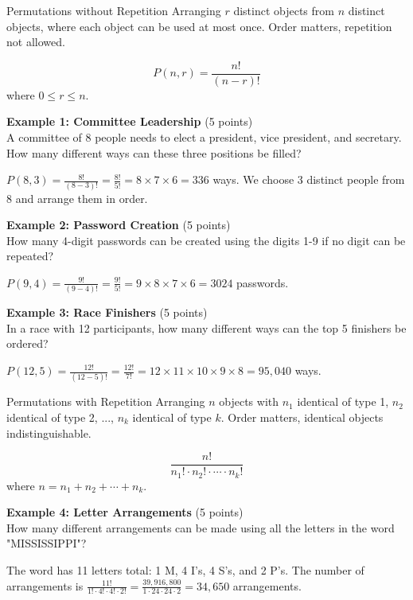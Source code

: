 \newpage



\begin{define}{Permutations without Repetition}
Arranging $r$ distinct objects from $n$ distinct objects, where each object 
can be used at most once. Order matters, repetition not allowed.

$$P(n,r) = \frac{n!}{(n-r)!}$$
where $0 \leq r \leq n$.
\end{define}

\textbf{Example 1: Committee Leadership} (5 points)\\
A committee of 8 people needs to elect a president, vice president, and secretary. How many different ways can these three positions be filled?
\begin{subanswer}
    $P(8,3) = \frac{8!}{(8-3)!} = \frac{8!}{5!} = 8 \times 7 \times 6 = 336$ ways. We choose 3 distinct people from 8 and arrange them in order.
\end{subanswer}

\textbf{Example 2: Password Creation} (5 points)\\
How many 4-digit passwords can be created using the digits 1-9 if no digit can be repeated?
\begin{subanswer}
    $P(9,4) = \frac{9!}{(9-4)!} = \frac{9!}{5!} = 9 \times 8 \times 7 \times 6 = 3024$ passwords.
\end{subanswer}

\textbf{Example 3: Race Finishers} (5 points)\\
In a race with 12 participants, how many different ways can the top 5 finishers be ordered?
\begin{subanswer}
    $P(12,5) = \frac{12!}{(12-5)!} = \frac{12!}{7!} = 12 \times 11 \times 10 \times 9 \times 8 = 95,040$ ways.
\end{subanswer}

\begin{define}{Permutations with Repetition}
Arranging $n$ objects with $n_1$ identical of type 1, $n_2$ identical of type 2, 
..., $n_k$ identical of type $k$. Order matters, identical objects indistinguishable.

$$\frac{n!}{n_1! \cdot n_2! \cdot \cdots \cdot n_k!}$$
where $n = n_1 + n_2 + \cdots + n_k$.
\end{define}

\textbf{Example 4: Letter Arrangements} (5 points)\\
How many different arrangements can be made using all the letters in the word "MISSISSIPPI"?
\begin{subanswer}
    The word has 11 letters total: 1 M, 4 I's, 4 S's, and 2 P's. The number of arrangements is $\frac{11!}{1! \cdot 4! \cdot 4! \cdot 2!} = \frac{39,916,800}{1 \cdot 24 \cdot 24 \cdot 2} = 34,650$ arrangements.
\end{subanswer}

